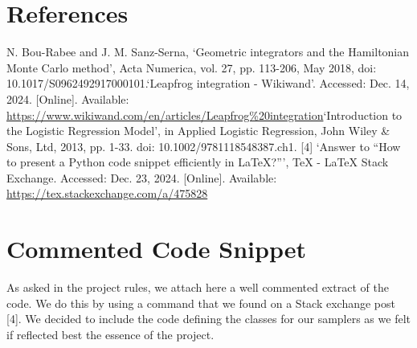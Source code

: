 \documentclass[a4paper, 12pt,oneside]{article}
\begin{document}
	\section*{References}
	\noindent
	[1] N. Bou-Rabee and J. M. Sanz-Serna, `Geometric integrators and the Hamiltonian Monte Carlo method', Acta Numerica, vol. 27, pp. 113-206, May 2018, doi: 10.1017/S0962492917000101.\newline
	[2] `Leapfrog integration - Wikiwand'. Accessed: Dec. 14, 2024. [Online]. Available: \url{https://www.wikiwand.com/en/articles/Leapfrog%20integration}\newline
	[3] `Introduction to the Logistic Regression Model', in Applied Logistic Regression, John Wiley \& Sons, Ltd, 2013, pp. 1-33. doi: 10.1002/9781118548387.ch1.\newline
	[4] `Answer to “How to present a Python code snippet efficiently in LaTeX?”’, TeX - LaTeX Stack Exchange. Accessed: Dec. 23, 2024. [Online]. Available: \url{https://tex.stackexchange.com/a/475828}
	\appendix
		\section{Commented Code Snippet}\label{appendix:commented-code-snippet}
		As asked in the project rules, we attach here a well commented extract of the code. We do this by using a command that we found on a Stack exchange post [4]. We decided to include the code defining the classes for our samplers as we felt if reflected best the essence of the project.
\end{document}
